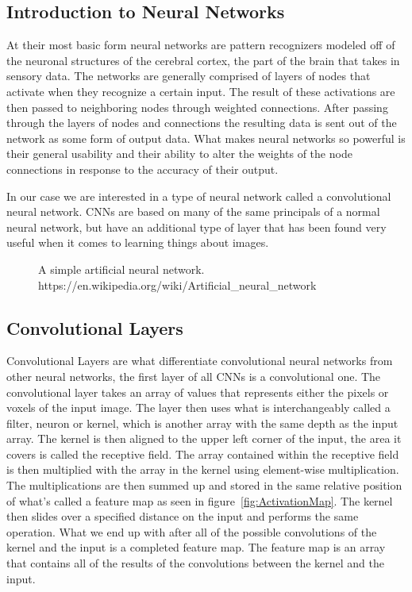 \documentclass{sig-alternate}
\begin{document}
\subsection{Introduction to Neural Networks}
\label{sec:introNeuralNetworks}

At their most basic form neural networks are pattern recognizers modeled off of the neuronal structures of the cerebral cortex, the part of the brain that takes in sensory data. The networks are generally comprised of layers of nodes that activate when they recognize a certain input. The result of these activations are then passed to neighboring nodes through weighted connections. After passing   through the layers of nodes and connections the resulting data is sent out of the network as some form of output data. What makes neural networks so powerful is their general usability and their ability to alter the weights of the node connections in response to the accuracy of their output.

In our case we are interested in a type of neural network called a convolutional neural network. CNNs are based on many of the same principals of a normal neural network, but have an additional type of layer that has been found very useful when it comes to learning things about images.

\begin{figure}
\centering
{}
\caption{A simple artificial neural network. https://en.wikipedia.org/wiki/Artificial\_neural\_network}
\label{fig:ANN}
\end{figure}

\subsection{Convolutional Layers}
\label{sec:convolutionalLayers}

Convolutional Layers are what differentiate convolutional neural networks from other neural networks, the first layer of all CNNs is a convolutional one. The convolutional layer takes an array of values that represents either the pixels or voxels of the input image. The layer then uses what is interchangeably called a filter, neuron or kernel, which is another array with the same depth as the input array. The kernel is then aligned to the upper left corner of the input, the area it covers is called the receptive field. The array contained within the receptive field is then multiplied with the array in the kernel using element-wise multiplication. The multiplications are then summed up and stored in the same relative position of what's called a feature map as seen in figure~\ref{fig:ActivationMap}. The kernel then slides over a specified distance on the input and performs the same operation. What we end up with after all of the possible convolutions of the kernel and the input is a completed feature map. The feature map is an array that contains all of the results of the convolutions between the kernel and the input.
\end{document}
